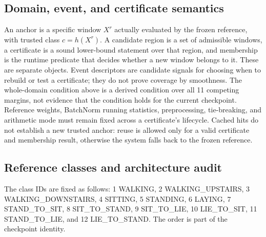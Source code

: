 \documentclass[11pt,a4paper]{article}
\begin{document}
\subsection{Domain, event, and certificate semantics}
An anchor is a specific window $X^r$ actually evaluated by the frozen reference,
with trusted class $c=h(X^r)$. A candidate region is a set of admissible
windows, a certificate is a sound lower-bound statement over that region, and
membership is the runtime predicate that decides whether a new window belongs
to it. These are separate objects. Event descriptors are candidate signals for
choosing when to rebuild or test a certificate; they do not prove coverage by
smoothness. The whole-domain condition above is a derived condition over all
11 competing margins, not evidence that the condition holds for the current
checkpoint. Reference weights, BatchNorm running statistics, preprocessing,
tie-breaking, and arithmetic mode must remain fixed across a certificate's
lifecycle. Cached hits do not establish a new trusted anchor: reuse is allowed
only for a valid certificate and membership result, otherwise the system falls
back to the frozen reference.

\subsection{Reference classes and architecture audit}
The class IDs are fixed as follows: 1 WALKING, 2 WALKING\_UPSTAIRS, 3
WALKING\_DOWNSTAIRS, 4 SITTING, 5 STANDING, 6 LAYING, 7 STAND\_TO\_SIT, 8
SIT\_TO\_STAND, 9 SIT\_TO\_LIE, 10 LIE\_TO\_SIT, 11 STAND\_TO\_LIE, and 12
LIE\_TO\_STAND. The order is part of the checkpoint identity.
\end{document}
